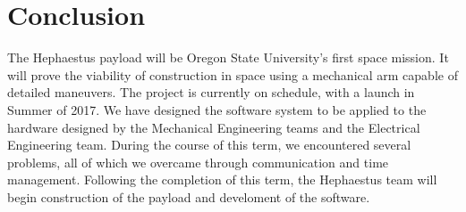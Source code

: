 \documentclass[letterpaper,10pt]{article}
\begin{document}
\section{Conclusion}
The Hephaestus \gls{payload} will be Oregon State University's first space mission. 
It will prove the viability of construction in space using a mechanical arm 
capable of detailed maneuvers. The project is currently on schedule, with a 
launch in Summer of 2017. We have designed the software system to be applied to 
the hardware designed by the Mechanical Engineering teams and the Electrical 
Engineering team. During the course of this term, we encountered several 
problems, all of which we overcame through communication and time management. 
Following the completion of this term, the Hephaestus team will begin 
construction of the \gls{payload} and develoment of the software.


\clearpage
\printglossary[numberedsection]
\end{document}
